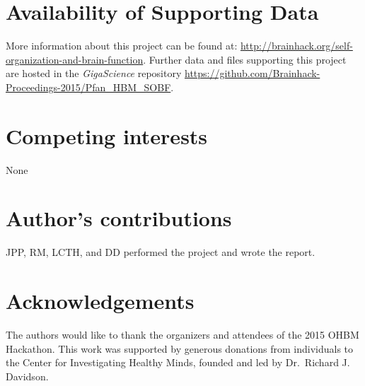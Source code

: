 \documentclass[twocolumn]{bmcart}%
\begin{document}
\begin{backmatter}

\section*{Availability of Supporting Data}
More information about this project can be found at: 
\url{http://brainhack.org/self-organization-and-brain-function}. 
Further data and files supporting this project are hosted in the 
\emph{GigaScience} repository 
\url{https://github.com/Brainhack-Proceedings-2015/Pfan_HBM_SOBF}.

\section*{Competing interests}
None

\section*{Author's contributions}
JPP, RM, LCTH, and DD performed the project and wrote the report.

\section*{Acknowledgements}
The authors would like to thank the organizers and attendees of the 2015
OHBM Hackathon. This work was supported by generous donations from
individuals to the Center for Investigating Healthy Minds, founded and
led by Dr.~Richard J. Davidson.

  
  


\end{backmatter}
\end{document}
